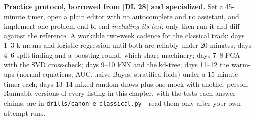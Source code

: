 \begin{warningbox}
\textbf{Practice protocol, borrowed from [DL 28] and specialized.} Set a 45-minute timer, open a plain editor with no autocomplete and no assistant, and implement one problem end to end \emph{including its test}; only then run it and diff against the reference. A workable two-week cadence for the classical track: days 1--3 k-means and logistic regression until both are reliably under 20 minutes; days 4--6 split finding and a boosting round, which share machinery; days 7--8 PCA with the SVD cross-check; days 9--10 kNN and the kd-tree; days 11--12 the warm-ups (normal equations, AUC, naive Bayes, stratified folds) under a 15-minute timer each; days 13--14 mixed random draws plus one mock with another person. Runnable versions of every listing in this chapter, with the tests each answer claims, are in \texttt{drills/canon\_e\_classical.py}---read them only after your own attempt runs.
\end{warningbox}
